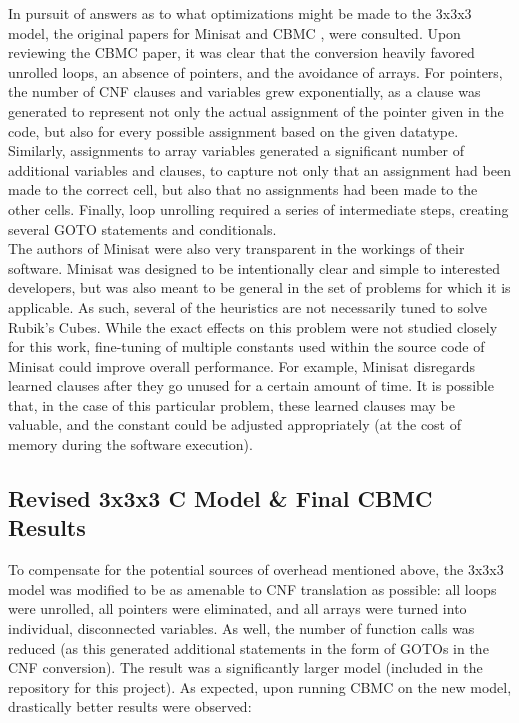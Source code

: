 \documentclass{article}
\begin{document}
In pursuit of answers as to what optimizations might be made to the 3x3x3 model, the original papers for Minisat \cite{een} and CBMC \cite{clarke}, \cite{clarke2} were consulted. Upon reviewing the CBMC paper, it was clear that the conversion heavily favored unrolled loops, an absence of pointers, and the avoidance of arrays. For pointers, the number of CNF clauses and variables grew exponentially, as a clause was generated to represent not only the actual assignment of the pointer given in the code, but also for every possible assignment based on the given datatype. Similarly, assignments to array variables generated a significant number of additional variables and clauses, to capture not only that an assignment had been made to the correct cell, but also that no assignments had been made to the other cells. Finally, loop unrolling required a series of intermediate steps, creating several GOTO statements and conditionals. \\

\noindent The authors of Minisat were also very transparent in the workings of their software. Minisat was designed to be intentionally clear and simple to interested developers, but was also meant to be general in the set of problems for which it is applicable. As such, several of the heuristics are not necessarily tuned to solve Rubik's Cubes. While the exact effects on this problem were not studied closely for this work, fine-tuning of multiple constants used within the source code of Minisat could improve overall performance. For example, Minisat disregards learned clauses after they go unused for a certain amount of time. It is possible that, in the case of this particular problem, these learned clauses may be valuable, and the constant could be adjusted appropriately (at the cost of memory during the software execution).

\subsection {Revised 3x3x3 C Model \& Final CBMC Results}

To compensate for the potential sources of overhead mentioned above, the 3x3x3 model was modified to be as amenable to CNF translation as possible: all loops were unrolled, all pointers were eliminated, and all arrays were turned into individual, disconnected variables. As well, the number of function calls was reduced (as this generated additional statements in the form of GOTOs in the CNF conversion). The result was a significantly larger model (included in the repository for this project). As expected, upon running CBMC on the new model, drastically better results were observed:\\
\end{document}
